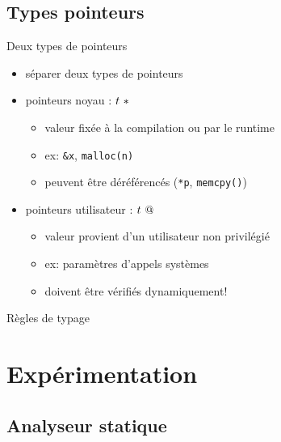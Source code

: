 \documentclass{beamer}
\begin{document}
\subsection{Types pointeurs}

\begin{frame}{Deux types de pointeurs}

\begin{itemize}
\item séparer deux types de pointeurs
\item pointeurs noyau : $\ptrK{t}$

  \begin{itemize}
  \item valeur fixée à la compilation ou par le runtime
  \item ex: \texttt{\&x}, \texttt{malloc(n)}
  \item peuvent être déréférencés (\texttt{*p}, \texttt{memcpy()})
  \end{itemize}
\item pointeurs utilisateur : $\ptrU{t}$

  \begin{itemize}
  \item valeur provient d'un utilisateur non privilégié
  \item ex: paramètres d'appels systèmes
  \item doivent être vérifiés dynamiquement!
  \end{itemize}
\end{itemize}

\end{frame}

\begin{frame}{Règles de typage}
    \begin{mathpar}



    \end{mathpar}
\end{frame}

\section{Expérimentation}

\subsection{Analyseur statique}
\end{document}

